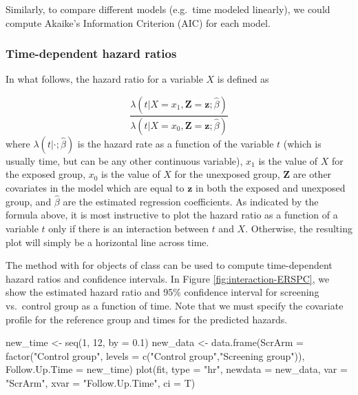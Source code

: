 Similarly, to compare different models (e.g.~time modeled linearly), we
could compute Akaike's Information Criterion (AIC) for each model.

\hypertarget{time-dependent-hazard-ratios}{%
\subsubsection{Time-dependent hazard
ratios}\label{time-dependent-hazard-ratios}}

In what follows, the hazard ratio for a variable \(X\) is defined as

\[
\frac{\lambda\left(t | X=x_1, \mathbf{Z}=\mathbf{z} ; \hat{\beta}\right)}{\lambda(t | X=x_0, \mathbf{Z}=\mathbf{z} ; \hat{\beta})}
\] where \(\lambda(t|\cdot;\hat{\beta})\) is the hazard rate as a
function of the variable \(t\) (which is usually time, but can be any
other continuous variable), \(x_1\) is the value of \(X\) for the
exposed group, \(x_0\) is the value of \(X\) for the unexposed group,
\(\mathbf{Z}\) are other covariates in the model which are equal to
\(\mathbf{z}\) in both the exposed and unexposed group, and
\(\hat{\beta}\) are the estimated regression coefficients. As indicated
by the formula above, it is most instructive to plot the hazard ratio as
a function of a variable \(t\) only if there is an interaction between
\(t\) and \(X\). Otherwise, the resulting plot will simply be a
horizontal line across time.

The  method with  for objects of class
 can be used to compute time-dependent hazard ratios
and confidence intervals. In Figure \ref{fig:interaction-ERSPC}, we show
the estimated hazard ratio and 95\% confidence interval for screening
vs.~control group as a function of time. Note that we must specify the
covariate profile for the reference group and times for the predicted
hazards.

\begin{Schunk}
\begin{Sinput}
new_time <- seq(1, 12, by  = 0.1)
new_data <- data.frame(ScrArm = factor("Control group",
                                         levels = c("Control group","Screening group")),
                      Follow.Up.Time = new_time)
plot(fit, type = "hr", newdata = new_data,
     var = "ScrArm", xvar = "Follow.Up.Time", ci = T)
\end{Sinput}
\end{Schunk}

